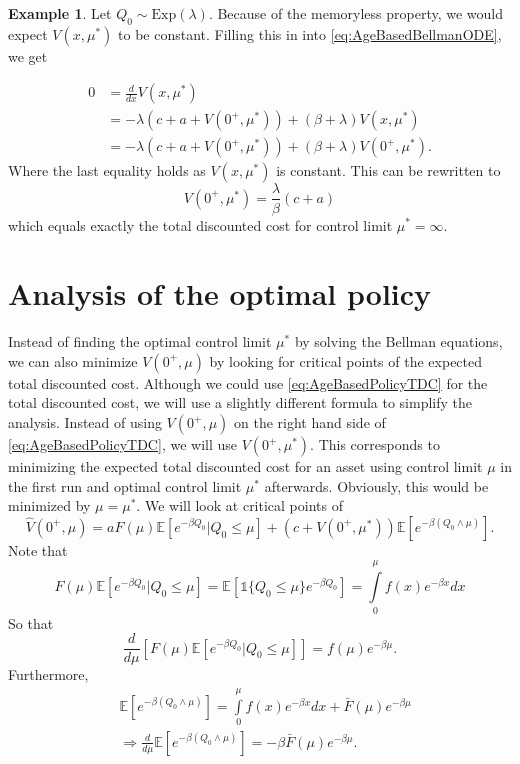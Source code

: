 \documentclass[a4paper]{thesis}
\theoremstyle{definition}
\newtheorem{example}{Example}[chapter]
\begin{document}
\begin{example}
	Let $Q_0\sim\text{Exp}(\lambda)$.
	Because of the memoryless property, we would expect $V(x,\mu^*)$ to be constant.
	Filling this in into \eqref{eq:AgeBasedBellmanODE}, we get
	
	\[
	\begin{split}
	0&=\frac{d}{dx}V(x,\mu^*)\\
	&=-\lambda(c+a+ V(0^+,\mu^*))+(\beta+ \lambda) V(x,\mu^*)\\
	&=-\lambda(c+a+ V(0^+,\mu^*))+(\beta+ \lambda) V(0^+,\mu^*).
	\end{split}
	\]
	Where the last equality holds as $V(x,\mu^*)$ is constant.
	This can be rewritten to
	$$
	V(0^+,\mu^*)=\frac{\lambda}{\beta}(c+a)
	$$
	which equals exactly the total discounted cost for control limit $\mu^*=\infty$.
\end{example} \section{Analysis of the optimal policy}\label{section:AgeBasedOptimalPolicy}
Instead of finding the optimal control limit $\mu^*$ by solving the Bellman equations, we can also minimize $V(0^+,\mu)$ by looking for critical points of the expected total discounted cost.
Although we could use \eqref{eq:AgeBasedPolicyTDC} for the total discounted cost, we will use a slightly different formula to simplify the analysis.
Instead of using $V(0^+,\mu)$ on the right hand side of \eqref{eq:AgeBasedPolicyTDC}, we will use $V(0^+,\mu^*)$.
This corresponds to minimizing the expected total discounted cost for an asset using control limit $\mu$ in the first run and optimal control limit $\mu^*$ afterwards.
Obviously, this would be minimized by $\mu=\mu^*$.
We will look at critical points of
\begin{equation}\label{eq:AgeBasedHatTDC}
\hat{V}(0^+,\mu)=aF(\mu)\mathbb{E}[e^{-\beta Q_0}|Q_0\leq \mu]+(c+V(0^+,\mu^*))\mathbb{E}[e^{-\beta(Q_0\wedge\mu)}].
\end{equation}
Note that 
\[
F(\mu)\mathbb{E}[e^{-\beta Q_0}|Q_0\leq \mu]=\mathbb{E}[\mathds{1}\{Q_0\leq \mu\}e^{-\beta Q_0}]=\int\limits_0^\mu f(x)e^{-\beta x}dx
\]
So that
\[
\frac{d}{d\mu}\left[F(\mu)\mathbb{E}[e^{-\beta Q_0}|Q_0\leq \mu]\right]=f(\mu)e^{-\beta \mu}.
\]
Furthermore,
\[
\begin{split}
&\mathbb{E}[e^{-\beta(Q_0\wedge\mu)}]=\int\limits_0^\mu f(x)e^{-\beta x}dx+\bar{F}(\mu)e^{-\beta\mu}\\
&\Rightarrow \frac{d}{d\mu}\mathbb{E}[e^{-\beta(Q_0\wedge\mu)}]=-\beta\bar{F}(\mu)e^{-\beta\mu}.
\end{split}
\]
\end{document}
